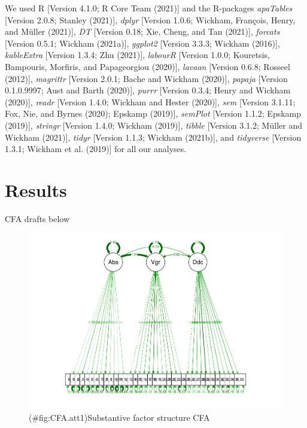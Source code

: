 \documentclass[
  english,
  man]{apa6}
\begin{document}
We used R {[}Version 4.1.0; R Core Team (2021){]} and the R-packages \emph{apaTables} {[}Version 2.0.8; Stanley (2021){]}, \emph{dplyr} {[}Version 1.0.6; Wickham, François, Henry, and Müller (2021){]}, \emph{DT} {[}Version 0.18; Xie, Cheng, and Tan (2021){]}, \emph{forcats} {[}Version 0.5.1; Wickham (2021a){]}, \emph{ggplot2} {[}Version 3.3.3; Wickham (2016){]}, \emph{kableExtra} {[}Version 1.3.4; Zhu (2021){]}, \emph{labourR} {[}Version 1.0.0; Kouretsis, Bampouris, Morfiris, and Papageorgiou (2020){]}, \emph{lavaan} {[}Version 0.6.8; Rosseel (2012){]}, \emph{magrittr} {[}Version 2.0.1; Bache and Wickham (2020){]}, \emph{papaja} {[}Version 0.1.0.9997; Aust and Barth (2020){]}, \emph{purrr} {[}Version 0.3.4; Henry and Wickham (2020){]}, \emph{readr} {[}Version 1.4.0; Wickham and Hester (2020){]}, \emph{sem} {[}Version 3.1.11; Fox, Nie, and Byrnes (2020); Epskamp (2019){]}, \emph{semPlot} {[}Version 1.1.2; Epskamp (2019){]}, \emph{stringr} {[}Version 1.4.0; Wickham (2019){]}, \emph{tibble} {[}Version 3.1.2; Müller and Wickham (2021){]}, \emph{tidyr} {[}Version 1.1.3; Wickham (2021b){]}, and \emph{tidyverse} {[}Version 1.3.1; Wickham et al. (2019){]} for all our analyses.

\hypertarget{results}{%
\section{Results}\label{results}}

CFA drafts below

\begin{figure}
\centering
\includegraphics{SIOPpapaja_files/figure-latex/CFA.att1-1.pdf}
\caption{(\#fig:CFA.att1)Substantive factor structure CFA}
\end{figure}
\end{document}
